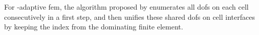 








For \hp-adaptive \gls{fem}, the algorithm proposed by \textcite[Sec.~4.2]{bangerth2009} enumerates all \glspl{dof} on each cell consecutively in a first step, and then unifies these shared \glspl{dof} on cell interfaces by keeping the index from the dominating finite element.

